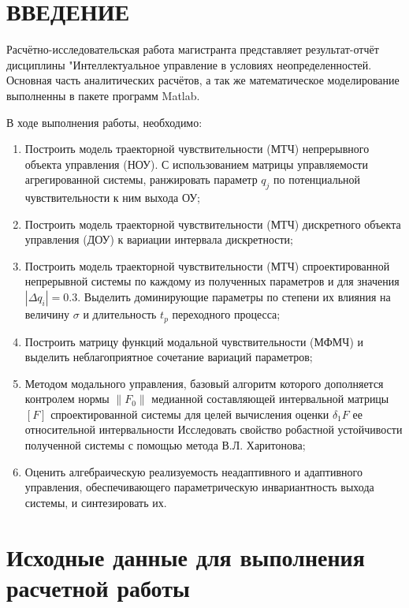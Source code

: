 \section*{ВВЕДЕНИЕ}

	
	Расчётно-исследовательская работа магистранта представляет  результат-отчёт дисциплины "Интеллектуальное управление в условиях неопределенностей. Основная часть аналитических расчётов, а так же математическое моделирование выполненны в пакете программ Matlab.
	\par
	В ходе выполнения работы, необходимо:
	
	\begin{enumerate}
			\item
			Построить модель траекторной чувствительности (МТЧ) непрерывного объекта управления (НОУ). С использованием матрицы управляемости агрегированной системы, ранжировать параметр $q_{j}$ по потенциальной чувствительности к ним выхода ОУ;
	\item
		 	Построить модель траекторной чувствительности (МТЧ) дискретного объекта управления (ДОУ) к вариации интервала дискретности;
		\item
			Построить модель траекторной чувствительности (МТЧ) спроектированной непрерывной системы по каждому из полученных параметров и для значения $|\bm{\mathit{\Delta}}q_{i}|=0.3$. Выделить доминирующие параметры по степени их влияния на величину $ \sigma $ и длительность $t_{p} $ переходного процесса;
		\item
			Построить матрицу функций модальной чувствительности (МФМЧ) и выделить неблагоприятное сочетание вариаций параметров;
		\item
			Методом модального управления, базовый алгоритм которого дополняется контролем нормы $ \|F_{0}\| $ медианной составляющей интервальной матрицы $[F]  $ спроектированной системы для целей вычисления оценки $ \delta_{1}F $ ее относительной интервальности Исследовать свойство робастной устойчивости полученной системы с помощью метода В.Л. Харитонова;
    	\item
			Оценить алгебраическую реализуемость неадаптивного и адаптивного управления, обеспечивающего параметрическую инвариантность выхода системы, и синтезировать их.

\end{enumerate}
\newpage
\section*{Исходные данные для выполнения расчетной работы}

